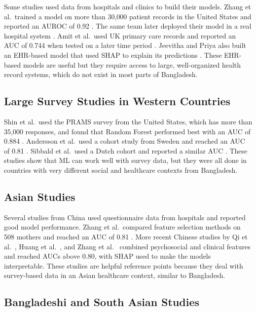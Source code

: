Some studies used data from hospitals and clinics to build their models. Zhang et al.\ trained a model on more than 30,000 patient records in the United States and reported an AUROC of 0.92 \cite{zhang2021development}. The same team later deployed their model in a real hospital system \cite{zhang2024implementation}. Amit et al.\ used UK primary care records and reported an AUC of 0.744 when tested on a later time period \cite{amit2021estimation}. Jeevitha and Priya also built an EHR-based model that used SHAP to explain its predictions \cite{jeevitha2025early}. These EHR-based models are useful but they require access to large, well-organized health record systems, which do not exist in most parts of Bangladesh.

\subsection{Large Survey Studies in Western Countries}

Shin et al.\ used the PRAMS survey from the United States, which has more than 35,000 responses, and found that Random Forest performed best with an AUC of 0.884 \cite{shin2020machine}. Andersson et al.\ used a cohort study from Sweden and reached an AUC of 0.81 \cite{andersson2021predicting}. Sibbald et al.\ used a Dutch cohort and reported a similar AUC \cite{sibbald2025identifying}. These studies show that ML can work well with survey data, but they were all done in countries with very different social and healthcare contexts from Bangladesh.

\subsection{Asian Studies}

Several studies from China used questionnaire data from hospitals and reported good model performance. Zhang et al.\ compared feature selection methods on 508 mothers and reached an AUC of 0.81 \cite{zhang2020machine}. More recent Chinese studies by Qi et al.\ \cite{qi2025prediction}, Huang et al.\ \cite{huang2025postpartum}, and Zhang et al.\ \cite{zhang2025interpretable} combined psychosocial and clinical features and reached AUCs above 0.80, with SHAP used to make the models interpretable. These studies are helpful reference points because they deal with survey-based data in an Asian healthcare context, similar to Bangladesh.

\subsection{Bangladeshi and South Asian Studies}


